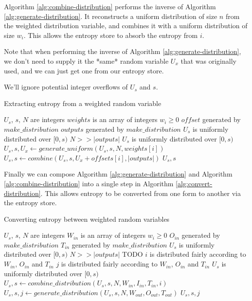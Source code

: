 \documentclass[12pt]{article}
\begin{document}
Algorithm \ref{alg:combine-distribution} performs the inverse of Algorithm \ref{alg:generate-distribution}. It reconstructs a uniform distribution of size $n$ from the weighted distribution variable, and combines it with a uniform distribution of size $w_i$. This allows the entropy store to absorb the entropy from $i$.

Note that when performing the inverse of Algorithm \ref{alg:generate-distribution}, we don't need to supply it the *same* random variable $U_x$ that was originally used, and we can just get one from our entropy store.

We'll ignore potential integer overflows of $U_s$ and $s$.

\begin{algorithm}
\caption{Extracting entropy from a weighted random variable}
\label{alg:combine-distribution}
\begin{algorithmic}[1]
\Require $U_s$, $s$, $N$ are integers
\Require $weights$ is an array of integers $w_i \ge 0$
\Require $offset$ generated by $make\_distribution$ 
\Require $outputs$ generated by $make\_distribution$
\Require $U_s$ is uniformly distributed over $[0,s)$
\Require $N >> |outputs|$
\Ensure $U_s$ is uniformly distributed over $[0,s)$
    \State $U_s, s, U_x \gets generate\_uniform(U_s, s, N, weights[i])$
    \State $U_s, s \gets combine(U_s, s, U_x + offsets[i], |outputs|)$
    \State \Return $U_s, s$
\EndProcedure
\end{algorithmic}
\end{algorithm}

Finally we can compose Algorithm \ref{alg:generate-distribution} and Algorithm \ref{alg:combine-distribution} into a single step in Algorithm \ref{alg:convert-distribution}. This allows entropy to be converted from one form to another via the entropy store.


\begin{algorithm}
\caption{Converting entropy between weighted random variables}
\label{alg:convert-distribution}
\begin{algorithmic}[1]
\Require $U_s$, $s$, $N$ are integers
\Require $W_{in}$ is an array of integers $w_i \ge 0$
\Require $O_{in}$ generated by $make\_distribution$ 
\Require $T_{in}$ generated by $make\_distribution$
\Require $U_s$ is uniformly distributed over $[0,s)$
\Require $N >> |outputs|$ TODO
\Require $i$ is distributed fairly according to $W_{in}$, $O_{in}$ and $T_{in}$
\Ensure $j$ is distributed fairly according to $W_{in}$, $O_{in}$ and $T_{in}$
\Ensure $U_s$ is uniformly distributed over $[0,s)$
    \State $U_s, s \gets combine\_distribution(U_s, s, N, W_{in}, I_{in}, T_{in}, i)$
    \State $U_s, s, j \gets generate\_distribution(U_s, s, N, W_{out}, O_{out}, T_{out})$
    \State \Return $U_s, s, j$
\EndProcedure
\end{algorithmic}
\end{algorithm}
\end{document}
